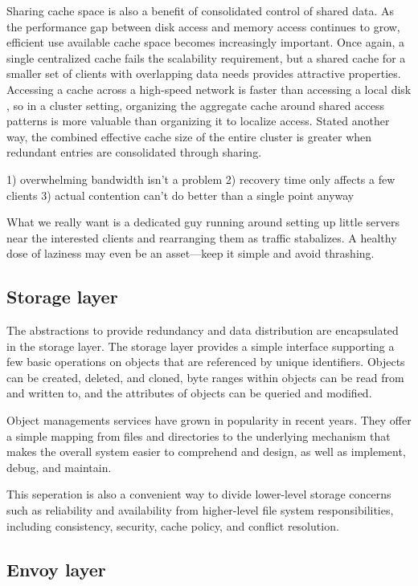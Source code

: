 Sharing cache space is also a benefit of consolidated control of shared data. As the performance gap between disk access and memory access continues to grow, efficient use available cache space becomes increasingly important. Once again, a single centralized cache fails the scalability requirement, but a shared cache for a smaller set of clients with overlapping data needs provides attractive properties. Accessing a cache across a high-speed network is faster than accessing a local disk \cite{dahlin94b}, so in a cluster setting, organizing the aggregate cache around shared access patterns is more valuable than organizing it to localize access. Stated another way, the combined effective cache size of the entire cluster is greater when redundant entries are consolidated through sharing.

1) overwhelming bandwidth isn't a problem
2) recovery time only affects a few clients
3) actual contention can't do better than a single point anyway

What we really want is a dedicated guy running around setting up little servers near the interested clients and rearranging them as traffic stabalizes. A healthy dose of laziness may even be an asset---keep it simple and avoid thrashing.

\subsection{Storage layer}

The abstractions to provide redundancy and data distribution are encapsulated in the storage layer. The storage layer provides a simple interface supporting a few basic operations on objects that are referenced by unique identifiers. Objects can be created, deleted, and cloned, byte ranges within objects can be read from and written to, and the attributes of objects can be queried and modified.

Object managements services have grown in popularity in recent years. They offer a simple mapping from files and directories to the underlying mechanism that makes the overall system easier to comprehend and design, as well as implement, debug, and maintain.

This seperation is also a convenient way to divide lower-level storage concerns such as reliability and availability from higher-level file system responsibilities, including consistency, security, cache policy, and conflict resolution.



\subsection{Envoy layer}
